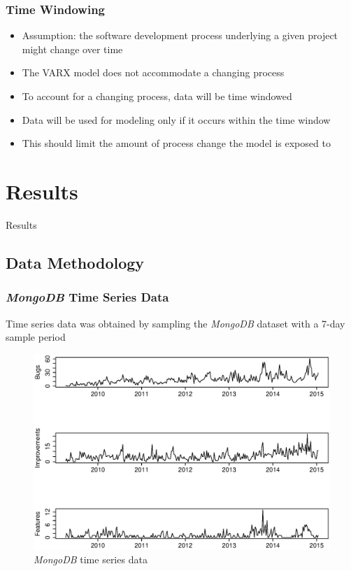 \documentclass[presentation]{beamer}
\begin{document}
\begin{frame}[t]
\frametitle{Time Windowing}
\begin{itemize}
\item{Assumption: the software development process underlying a given project might change over time}
\item{The VARX model does not accommodate a changing process}
\item{To account for a changing process, data will be time windowed}
\item{Data will be used for modeling only if it occurs within the time window}
\item{This should limit the amount of process change the model is exposed to}
\end{itemize}
\end{frame}

\section{Results}

\begin{frame}
\begin{center}
\Large{Results}
\end{center}
\end{frame}

\subsection{Data Methodology}

\begin{frame}[t]
\frametitle{\textit{MongoDB} Time Series Data}
Time series data was obtained by sampling the \textit{MongoDB} dataset with a 7-day sample period
\begin{figure}[htbp]
\begin{center}
\includegraphics[height=.6\textheight]{assets/time_series.eps}
\caption{\textit{MongoDB} time series data}
\end{center}
\end{figure}
\end{frame}
\end{document}
